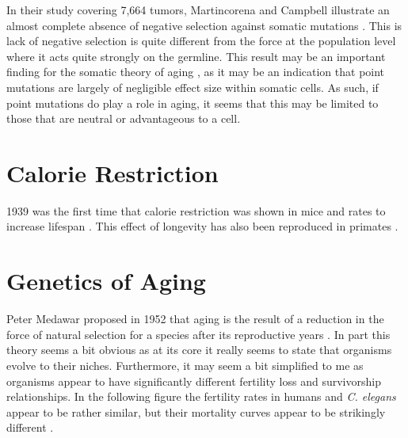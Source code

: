 \documentclass[]{book}
\newenvironment{Shaded}{\begin{snugshade}}{\end{snugshade}}
\newcommand{\DataTypeTok}[1]{\textcolor[rgb]{0.13,0.29,0.53}{#1}}
\newcommand{\DecValTok}[1]{\textcolor[rgb]{0.00,0.00,0.81}{#1}}
\newcommand{\KeywordTok}[1]{\textcolor[rgb]{0.13,0.29,0.53}{\textbf{#1}}}
\newcommand{\NormalTok}[1]{#1}
\newcommand{\OperatorTok}[1]{\textcolor[rgb]{0.81,0.36,0.00}{\textbf{#1}}}
\newcommand{\OtherTok}[1]{\textcolor[rgb]{0.56,0.35,0.01}{#1}}
\newcommand{\StringTok}[1]{\textcolor[rgb]{0.31,0.60,0.02}{#1}}
\begin{document}
In their study covering 7,664 tumors, Martincorena and Campbell illustrate an almost complete absence of negative selection against somatic mutations \citep{martincorena2017universal}. This is lack of negative selection is quite different from the force at the population level where it acts quite strongly on the germline. This result may be an important finding for the somatic theory of aging \citep{morley1995somatic}, as it may be an indication that point mutations are largely of negligible effect size
within somatic cells. As such, if point mutations do play a role in aging, it seems that this may be limited to those that are neutral or advantageous to a cell.

\hypertarget{calorie-restriction}{%
\section{Calorie Restriction}\label{calorie-restriction}}

1939 was the first time that calorie restriction was shown in mice and rates to increase lifespan \citep{mccay1935effect}. This effect of longevity has also been reproduced in primates \citep{pifferi2018caloric, mattison2017caloric}.

\hypertarget{genetics-of-aging}{%
\section{Genetics of Aging}\label{genetics-of-aging}}

Peter Medawar proposed in 1952 that aging is the result of a reduction in the force of natural selection for a species after its reproductive years \citep{medawar1952unsolved}. In part this theory seems a bit obvious as at its core it really seems to state that organisms evolve to their niches. Furthermore, it may seem a bit simplified to me as organisms appear to have significantly different fertility loss and survivorship relationships. In the following figure the fertility rates in humans and \emph{C. elegans} appear to be rather similar, but their mortality curves appear to be strikingly different \citep{aguilaniu2015mysterious}.

\begin{Shaded}
\end{Shaded}
\end{document}
